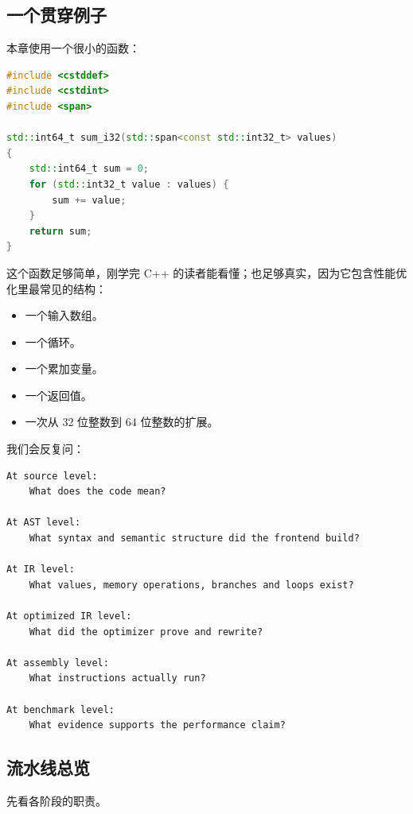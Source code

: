 \subsection{一个贯穿例子}

本章使用一个很小的函数：

\begin{lstlisting}[language=C++]
#include <cstddef>
#include <cstdint>
#include <span>

std::int64_t sum_i32(std::span<const std::int32_t> values)
{
    std::int64_t sum = 0;
    for (std::int32_t value : values) {
        sum += value;
    }
    return sum;
}
\end{lstlisting}

这个函数足够简单，刚学完 C++ 的读者能看懂；也足够真实，因为它包含性能优化里最常见的结构：

\begin{itemize}
  \item 一个输入数组。
  \item 一个循环。
  \item 一个累加变量。
  \item 一个返回值。
  \item 一次从 32 位整数到 64 位整数的扩展。
\end{itemize}

我们会反复问：

\begin{lstlisting}
At source level:
    What does the code mean?

At AST level:
    What syntax and semantic structure did the frontend build?

At IR level:
    What values, memory operations, branches and loops exist?

At optimized IR level:
    What did the optimizer prove and rewrite?

At assembly level:
    What instructions actually run?

At benchmark level:
    What evidence supports the performance claim?
\end{lstlisting}

\subsection{流水线总览}

先看各阶段的职责。


